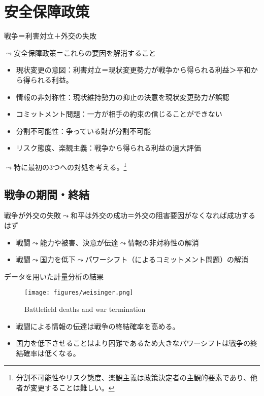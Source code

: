 \documentclass[
  xelatex,
  ja=standard]{bxjsarticle}
\providecommand{\tightlist}{%
  \setlength{\itemsep}{0pt}\setlength{\parskip}{0pt}}\usepackage{longtable,booktabs,array}
\begin{document}
\hypertarget{ux5b89ux5168ux4fddux969cux653fux7b56}{%
\section{安全保障政策}\label{ux5b89ux5168ux4fddux969cux653fux7b56}}

戦争＝利害対立＋外交の失敗

\(\leadsto\)安全保障政策＝これらの要因を解消すること

\begin{itemize}
\tightlist
\item
  現状変更の意図：利害対立＝現状変更勢力が戦争から得られる利益＞平和から得られる利益。
\item
  情報の非対称性：現状維持勢力の抑止の決意を現状変更勢力が誤認
\item
  コミットメント問題：一方が相手の約束の信じることができない
\item
  分割不可能性：争っている財が分割不可能
\item
  リスク態度、楽観主義：戦争から得られる利益の過大評価
\end{itemize}

\(\leadsto\)特に最初の3つへの対処を考える。\footnote{分割不可能性やリスク態度、楽観主義は政策決定者の主観的要素であり、他者が変更することは難しい。}

\hypertarget{ux6226ux4e89ux306eux671fux9593ux7d42ux7d50}{%
\subsection{戦争の期間・終結}\label{ux6226ux4e89ux306eux671fux9593ux7d42ux7d50}}

戦争が外交の失敗\(\leadsto\)和平は外交の成功＝外交の阻害要因がなくなれば成功するはず

\begin{itemize}
\tightlist
\item
  戦闘\(\leadsto\)能力や被害、決意が伝達\(\leadsto\)情報の非対称性の解消
\item
  戦闘\(\leadsto\)国力を低下\(\leadsto\)パワーシフト（によるコミットメント問題）の解消
\end{itemize}

データを用いた計量分析の結果\citep{weisiger2016}

\begin{figure}[htpb]

{\centering \texttt{[image: figures/weisinger.png]}

}

\caption{Battlefield deaths and war termination}

\end{figure}

\begin{itemize}
\tightlist
\item
  戦闘による情報の伝達は戦争の終結確率を高める。
\item
  国力を低下させることはより困難であるため大きなパワーシフトは戦争の終結確率は低くなる。
\end{itemize}


  
\end{document}
